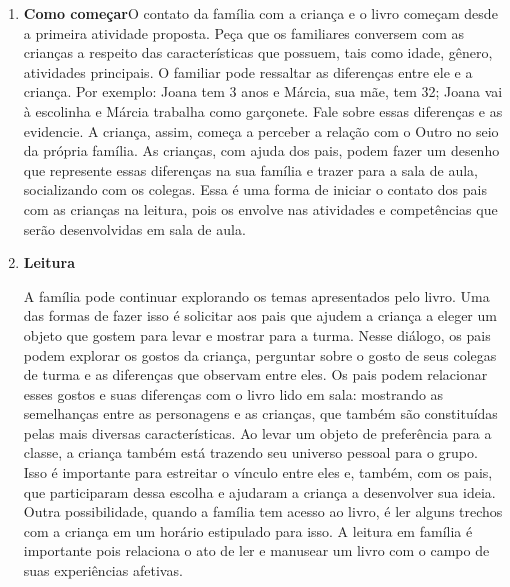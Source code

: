 \documentclass[11pt]{extarticle}
\begin{document}
\begin{enumerate}
\item \textbf{Como começar}\quad O contato da família com a criança e o livro começam desde a primeira atividade proposta. Peça que os familiares conversem com as crianças a respeito das características que possuem, tais como idade, gênero, atividades principais.
O familiar pode ressaltar as diferenças entre ele e a criança. Por exemplo: Joana tem 3 anos e Márcia, sua mãe, tem 32; Joana vai à escolinha e Márcia trabalha como garçonete.
Fale sobre essas diferenças e as evidencie. A criança, assim, começa a perceber a relação com o Outro no seio da própria família. As crianças, com ajuda dos pais, podem fazer um desenho que represente essas diferenças na sua família e trazer para a sala de aula, socializando com os colegas.
Essa é uma forma de iniciar o contato dos pais com as crianças na leitura, pois os envolve nas atividades e competências que serão desenvolvidas em sala de aula.

\item \textbf{Leitura}\quad 

 

A família pode continuar 
explorando os temas apresentados pelo livro. Uma das formas de fazer isso é solicitar aos pais que ajudem a criança a eleger um objeto que gostem para levar e mostrar para a turma.
Nesse diálogo, os pais podem explorar os gostos da criança, perguntar sobre o gosto de seus colegas de turma e as diferenças que observam entre eles. Os pais podem relacionar esses gostos e suas diferenças com o livro lido em sala: mostrando as semelhanças entre as personagens e as crianças, que também são constituídas pelas mais diversas características.
Ao levar um objeto de preferência para a classe, a criança também está trazendo seu universo pessoal para o grupo. Isso é importante para estreitar o vínculo entre eles e, também, com os pais, que participaram dessa escolha e ajudaram a criança a desenvolver sua ideia.
Outra possibilidade, quando a família tem acesso ao livro, é ler alguns trechos com a criança em um horário estipulado para isso. A leitura em família é importante pois relaciona o ato de ler e manusear um livro com o campo de suas experiências afetivas.


\end{enumerate}
\end{document}

